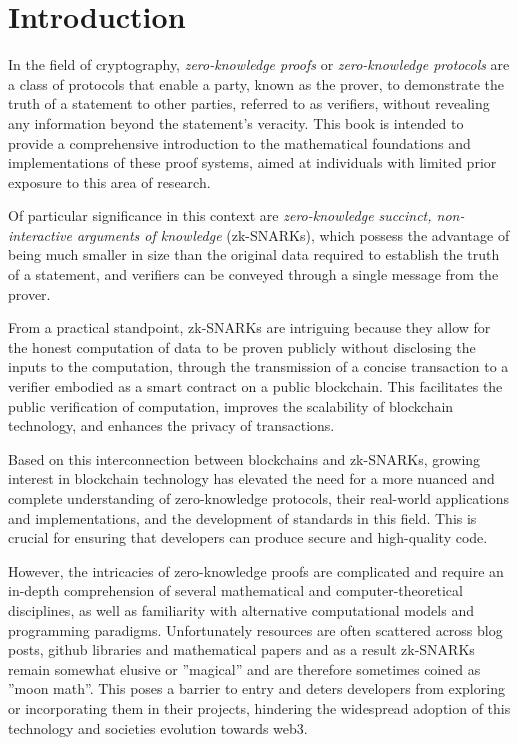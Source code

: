 \chapter{Introduction}
In the field of cryptography, \textit{zero-knowledge proofs} or \textit{zero-knowledge protocols} are a class of protocols that enable a party, known as the prover, to demonstrate the truth of a statement to other parties, referred to as verifiers, without revealing any information beyond the statement's veracity. This book is intended to provide a comprehensive introduction to the mathematical foundations and implementations of these proof systems, aimed at individuals with limited prior exposure to this area of research.

Of particular significance in this context are \textit{zero-knowledge succinct, non-interactive arguments of knowledge} (zk-SNARKs), which possess the advantage of being much smaller in size than the original data required to establish the truth of a statement, and verifiers can be conveyed through a single message from the prover.

From a practical standpoint, zk-SNARKs are intriguing because they allow for the honest computation of data to be proven publicly without disclosing the inputs to the computation, through the transmission of a concise transaction to a verifier embodied as a smart contract on a public blockchain. This facilitates the public verification of computation, improves the scalability of blockchain technology, and enhances the privacy of transactions.

Based on this interconnection between blockchains and zk-SNARKs, growing interest in blockchain technology has elevated the need for a more nuanced and complete understanding of zero-knowledge protocols, their real-world applications and implementations, and the development of standards in this field. This is crucial for ensuring that developers can produce secure and high-quality code.

However, the intricacies of zero-knowledge proofs are complicated and require an in-depth comprehension of several mathematical and computer-theoretical disciplines, as well as familiarity with alternative computational models and programming paradigms. Unfortunately resources are often scattered across blog posts, github libraries and mathematical papers and as a result zk-SNARKs remain somewhat elusive or ''magical'' and are therefore sometimes coined as ''moon math''. This poses a barrier to entry and deters developers from exploring or incorporating them in their projects, hindering the widespread adoption of this technology and societies evolution towards web3.

